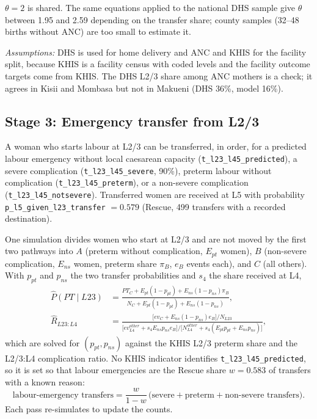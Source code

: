 \documentclass[11pt]{article}
\newcommand{\p}[1]{\texttt{#1}}
\begin{document}
$\theta=2$ is shared. The same equations applied to the national DHS sample
give $\theta$ between 1.95 and 2.59 depending on the transfer share; county
samples (32--48 births without ANC) are too small to estimate it.

\emph{Assumptions:} DHS is used for home delivery and ANC and KHIS for the facility
split, because KHIS is a facility census with coded levels and the facility
outcome targets come from KHIS. The DHS L2/3 share among ANC mothers is a check;
it agrees in Kisii and Mombasa but not in Makueni (DHS 36\%, model 16\%).

\subsection{Stage 3: Emergency transfer from L2/3}

A woman who starts labour at L2/3 can be transferred, in order, for a predicted
labour emergency without local caesarean capacity
(\p{t\_l23\_l45\_predicted}), a severe complication (\p{t\_l23\_l45\_severe},
90\%), preterm labour without complication (\p{t\_l23\_l45\_preterm}), or a
non-severe complication (\p{t\_l23\_l45\_notsevere}). Transferred women are
received at L5 with probability \p{p\_l5\_given\_l23\_transfer} $=0.579$ (Rescue,
499 transfers with a recorded destination).

One simulation divides women who start at L2/3 and are not moved by the first
two pathways into $A$ (preterm without complication, $E_{pt}$ women), $B$
(non-severe complication, $E_{ns}$ women, preterm share $\pi_B$, $e_B$ events
each), and $C$ (all others). With $p_{pt}$ and $p_{ns}$ the two transfer
probabilities and $s_4$ the share received at L4,
\begin{align}
\widehat P(PT\mid L23)&=\frac{PT_C+E_{pt}(1-p_{pt})+E_{ns}(1-p_{ns})\pi_B}{N_C+E_{pt}(1-p_{pt})+E_{ns}(1-p_{ns})},\\
\widehat R_{L23:L4}&=\frac{\bigl[ev_C+E_{ns}(1-p_{ns})e_B\bigr]/N_{L23}}
{\bigl[ev_{L4}^{other}+s_4E_{ns}p_{ns}e_B\bigr]/\bigl[N_{L4}^{other}+s_4(E_{pt}p_{pt}+E_{ns}p_{ns})\bigr]},
\end{align}
which are solved for $(p_{pt},p_{ns})$ against the KHIS L2/3 preterm share and
the L2/3:L4 complication ratio. No KHIS indicator identifies
\p{t\_l23\_l45\_predicted}, so it is set so that labour emergencies are the
Rescue share $w=0.583$ of transfers with a known reason:
\begin{equation}
\text{labour-emergency transfers}=\frac{w}{1-w}\,
\bigl(\text{severe}+\text{preterm}+\text{non-severe transfers}\bigr).
\end{equation}
Each pass re-simulates to update the counts.
\end{document}
